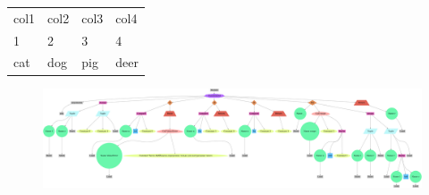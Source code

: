 \documentclass{article}
\begin{document}
\begin{table}[!htbp] 
\centering 
\small 
\begin{tabular}{|l|l|l|l|} 
\hline 
col1 & col2 & col3 & col4 \\ 
1 & 2 & 3 & 4 \\ 
cat & dog & pig & deer \\ 
\hline \end{tabular} 
\end{table}

\begin{figure}
\includegraphics[width=\textwidth]{ast_fib.png}
\end{figure}
\end{document}
